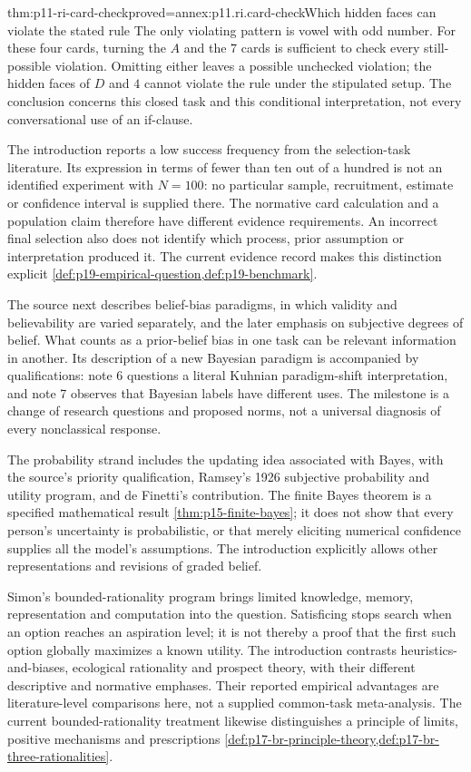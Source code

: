 \begin{hbtheorem}{thm:p11-ri-card-check}{proved=annex:p11.ri.card-check}{Which hidden faces can violate the stated rule}
The only violating pattern is vowel with odd number. For these four
cards, turning the \(A\) and the \(7\) cards is sufficient
to check every still-possible violation. Omitting either leaves
a possible unchecked violation; the hidden faces of \(D\) and
\(4\) cannot violate the rule under the stipulated setup.
The conclusion concerns this closed task and this conditional
interpretation, not every conversational use of an if-clause.
\end{hbtheorem}

The introduction reports a low success frequency from the selection-task
literature. Its expression in terms of fewer than ten out of a hundred
is not an identified experiment with \(N=100\): no particular sample,
recruitment, estimate or confidence interval is supplied there. The
normative card calculation and a population claim therefore have
different evidence requirements. An incorrect final selection also
does not identify which process, prior assumption or interpretation
produced it. The current evidence record makes this distinction explicit
\cref{def:p19-empirical-question,def:p19-benchmark}.

The source next describes belief-bias paradigms, in which validity and
believability are varied separately, and the later emphasis on subjective
degrees of belief. What counts as a prior-belief bias in one task can
be relevant information in another. Its description of a new Bayesian
paradigm is accompanied by qualifications: note 6 questions a literal
Kuhnian paradigm-shift interpretation, and note 7 observes that
Bayesian labels have different uses. The milestone is a change of
research questions and proposed norms, not a universal diagnosis of
every nonclassical response.

The probability strand includes the updating idea associated with Bayes,
with the source's priority qualification, Ramsey's 1926 subjective
probability and utility program, and de Finetti's contribution.
The finite Bayes theorem is a specified mathematical result
\cref{thm:p15-finite-bayes}; it does not show that every person's
uncertainty is probabilistic, or that merely eliciting numerical confidence
supplies all the model's assumptions. The introduction explicitly allows
other representations and revisions of graded belief.

Simon's bounded-rationality program brings limited knowledge, memory,
representation and computation into the question. Satisficing stops
search when an option reaches an aspiration level; it is not thereby
a proof that the first such option globally maximizes a known utility.
The introduction contrasts heuristics-and-biases, ecological rationality
and prospect theory, with their different descriptive and normative
emphases. Their reported empirical advantages are literature-level
comparisons here, not a supplied common-task meta-analysis.
The current bounded-rationality treatment likewise distinguishes a
principle of limits, positive mechanisms and prescriptions
\cref{def:p17-br-principle-theory,def:p17-br-three-rationalities}.

